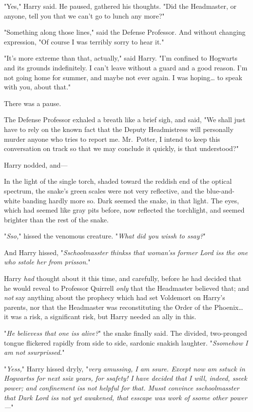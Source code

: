 "Yes," Harry said. He paused, gathered his thoughts. "Did the Headmaster, or 
anyone, tell you that we can't go to lunch any more?"

"Something along those lines," said the Defense Professor. And without changing 
expression, "Of course I was terribly sorry to hear it."

"It's more extreme than that, actually," said Harry. "I'm confined to Hogwarts 
and its grounds indefinitely. I can't leave without a guard and a good reason. 
I'm not going home for summer, and maybe not ever again. I was hoping{\ldots} 
to speak with you, about that."

There was a pause.

The Defense Professor exhaled a breath like a brief sigh, and said, "We shall 
just have to rely on the known fact that the Deputy Headmistress will 
personally murder anyone who tries to report me. Mr.~Potter, I intend to keep 
this conversation on track so that we may conclude it quickly, is that 
understood?"

Harry nodded, and---

In the light of the single torch, shaded toward the reddish end of the optical 
spectrum, the snake's green scales were not very reflective, and the 
blue-and-white banding hardly more so. Dark seemed the snake, in that light. 
The eyes, which had seemed like gray pits before, now reflected the torchlight, 
and seemed brighter than the rest of the snake.

"\emph{Sso,}" hissed the venomous creature. "\emph{What did you wissh to ssay?}"

And Harry hissed, "\emph{Sschoolmasster thinkss that woman'ss former Lord iss 
the one who sstole her from prisson}."

Harry \emph{had} thought about it this time, and carefully, before he had 
decided that he would reveal to Professor Quirrell \emph{only} that the 
Headmaster believed that; and \emph{not} say anything about the prophecy which 
had set Voldemort on Harry's parents, nor that the Headmaster was 
reconstituting the Order of the Phoenix{\ldots} it was a risk, a significant 
risk, but Harry needed an ally in this.

"\emph{He believess that one iss alive?}" the snake finally said. The divided, 
two-pronged tongue flickered rapidly from side to side, sardonic snakish 
laughter. "\emph{Ssomehow I am not ssurprissed.}"

"\emph{Yess,}" Harry hissed dryly, "\emph{very amussing, I am ssure. Except now 
am sstuck in Hogwartss for next ssix years, for ssafety! I have decided that I 
will, indeed, sseek power; and confinement iss not helpful for that. Musst 
convince sschoolmasster that Dark Lord iss not yet awakened, that esscape was 
work of ssome other power---}"

